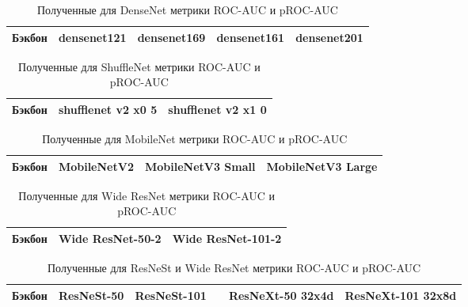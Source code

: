 \documentclass{article}
\begin{document}
\begin{large}
\begin{table}
\begin{tabular}{| p{2.5cm} | c | c | c | c | c | }
		\hline
	\end{tabular}
\end{table}

\begin{table}
	\caption{Полученные для DenseNet метрики ROC-AUC и pROC-AUC}\label{tab_dense}
	\centering
	\begin{tabular}{| p{2.5cm} | c | c | c | c | }
		\hline
		Бэкбон & densenet121 & densenet169 & densenet161 & densenet201 \\ \hline
		
		\hline
	\end{tabular}
\end{table}

\begin{table}
	\caption{Полученные для ShuffleNet метрики ROC-AUC и pROC-AUC}\label{tab_shuffle}
	\centering
	\begin{tabular}{| p{2.5cm} | c | c | }
		\hline
		Бэкбон & shufflenet v2 x0 5 & shufflenet v2 x1 0 \\ \hline
		
		\hline
	\end{tabular}
\end{table}

\begin{table}
	\caption{Полученные для MobileNet метрики ROC-AUC и pROC-AUC}\label{tab_mob}
	\centering
	\begin{tabular}{| l | c | c | c |}
		\hline
		Бэкбон & MobileNetV2 & MobileNetV3 Small & MobileNetV3 Large \\ \hline
		
		\hline
	\end{tabular}
\end{table}

\begin{table}
	\caption{Полученные для Wide ResNet метрики ROC-AUC и pROC-AUC}\label{tab_wide}
	\centering
	\begin{tabular}{| l | c | c | }
		\hline
		Бэкбон & Wide ResNet-50-2 & Wide ResNet-101-2 \\ \hline
		
		\hline
	\end{tabular}
\end{table}

\begin{table}
	\caption{Полученные для ResNeSt и Wide ResNet метрики ROC-AUC и pROC-AUC}\label{tab_nest_next}
	\centering
	\begin{tabular}{| l | c | c | c | c | c |}
		\hline
		Бэкбон & ResNeSt-50 & ResNeSt-101 & & ResNeXt-50 32x4d & ResNeXt-101 32x8d \\ \hline
		

\end{tabular}
\end{table}
\end{large}
\end{document}
